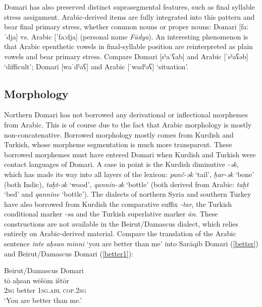 \documentclass[output=paper]{langsci/langscibook}
\begin{document}
Domari has also preserved distinct suprasegmental features, such as final syllable stress assignment. Arabic-derived items are fully integrated into this pattern and bear final primary stress, whether common nouns or proper nouns: Domari [faːˈdja] vs. Arabic [ˈfaːdja] (personal name \textit{Fādya}). An interesting phenomenon is that Arabic epenthetic vowels in final-syllable position are reinterpreted as plain vowels and bear primary stress.  Compare Domari [sˤaˈʕab] and Arabic [ˈsˤaʕəb] ‘difficult’; Domari [waˈdˤaʕ] and Arabic [ˈwadˤəʕ] ‘situation’.


 
 \subsection{Morphology}


Northern Domari has not borrowed any derivational or inflectional morphemes from Arabic. This is of course due to the fact that Arabic morphology is mostly non-concatenative. Borrowed morphology mostly comes from Kurdish and Turkish, whose morpheme segmentation is much more transparent. These borrowed morphemes must have entered Domari when Kurdish and Turkish were contact languages of Domari. A case in point is the Kurdish diminutive \textit{-ək}, which has made its way into all layers of the lexicon: \textit{panč-ək} ‘tail’, \textit{ḫar-ək} ‘bone’ (both Indic), \textit{taḫt-ək} ‘wood’, \textit{qannīn-ək} ‘bottle’ (both derived from Arabic: \textit{taḫt} ‘bed’ and \textit{qannīne} ‘bottle’). The dialects of northern Syria and southern Turkey have also borrowed from Kurdish the comparative suffix \textit{{}-tar}, the Turkish conditional marker \textit{{}-sa} and the Turkish superlative marker \textit{ān}. These constructions are not available in the Beirut/Damascus dialect, which relies entirely on Arabic-derived material. Compare the translation of the Arabic sentence \textit{inte} \textit{aḥsan} \textit{minni} ‘you are better than me’ into Sarāqib Domari (\ref{better}) and Beirut/Damascus Domari (\ref{better1}):

\ea 
{Beirut/Damascus Domari}\\ \label{better1}
\gll tō aḥsan wēšōm ištōr\\
 \textsc{2sg} better \textsc{1sg.abl} \textsc{cop.2sg} \\
\glt ‘You are better than me.’\\
\z
\end{document}
